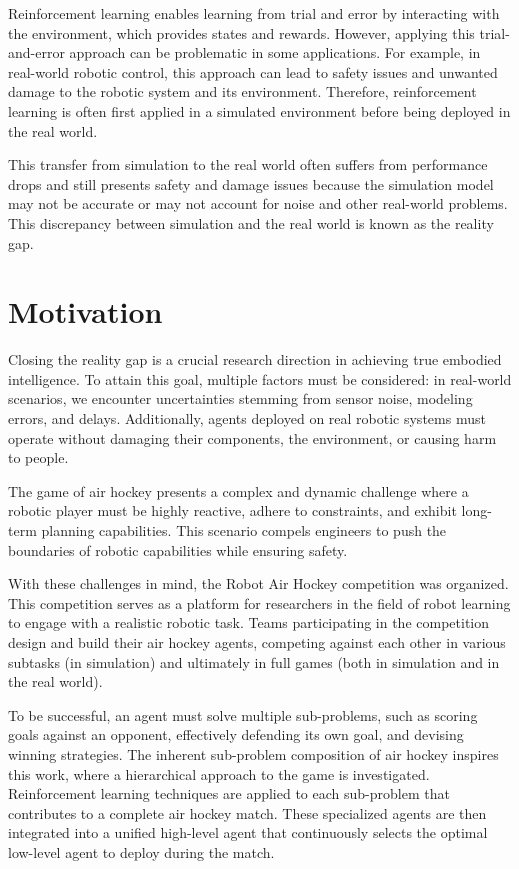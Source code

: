 Reinforcement learning enables learning from trial and error by interacting with the environment, 
which provides states and rewards. However, applying this trial-and-error approach can be problematic in some applications. 
For example, in real-world robotic control, this approach can lead to safety issues and unwanted damage to the robotic system and its environment. 
Therefore, reinforcement learning is often first applied in a simulated environment before being deployed in the real world.

This transfer from simulation to the real world often suffers from performance drops and still presents safety and damage issues because the simulation 
model may not be accurate or may not account for noise and other real-world problems. 
This discrepancy between simulation and the real world is known as the reality gap.
\section*{Motivation}

Closing the reality gap is a crucial research direction in achieving true embodied intelligence. 
To attain this goal, multiple factors must be considered: in real-world scenarios, 
we encounter uncertainties stemming from sensor noise, modeling errors, and delays. 
Additionally, agents deployed on real robotic systems must operate without damaging their components, the environment, or causing harm to people.

The game of air hockey presents a complex and dynamic challenge where a robotic player must be highly reactive, 
adhere to constraints, and exhibit long-term planning capabilities. 
This scenario compels engineers to push the boundaries of robotic capabilities while ensuring safety.

With these challenges in mind, the Robot Air Hockey competition was organized. 
This competition serves as a platform for researchers in the field of robot learning to engage with a realistic robotic task. 
Teams participating in the competition design and build their air hockey agents, 
competing against each other in various subtasks (in simulation) and ultimately in full games (both in simulation and in the real world).

To be successful, an agent must solve multiple sub-problems, such as scoring goals against an opponent, 
effectively defending its own goal, and devising winning strategies. 
The inherent sub-problem composition of air hockey inspires this work, where a hierarchical approach to the game is investigated. 
Reinforcement learning techniques are applied to each sub-problem that contributes to a complete air hockey match. 
These specialized agents are then integrated into a unified high-level agent that continuously selects the optimal low-level agent to deploy during the match.

